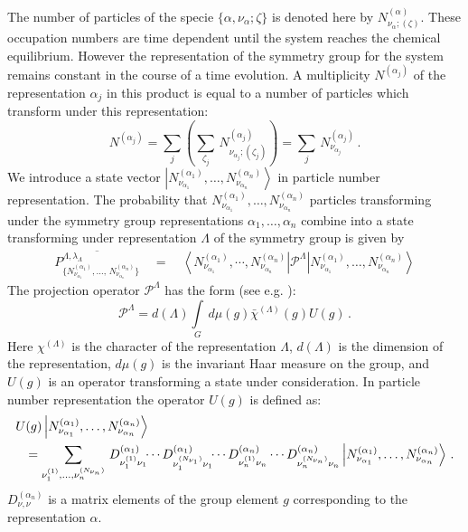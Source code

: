 \documentclass[a4paper,aps]{revtex4}
\begin{document}
The number of particles of the specie
$\{\alpha,\nu_\alpha;\zeta\}$ is denoted here by
$N^{(\alpha)}_{\nu_\alpha;(\zeta)}.$ These occupation numbers are
time dependent until the system reaches the chemical equilibrium.
However the representation of the symmetry group for the system
remains constant in the course of a time evolution. A multiplicity
$N^{(\alpha_j)}$ of the representation $\alpha_j$ in this product
is equal to a number of particles which transform under this
representation:
\begin{equation}
N^{(\alpha_j)} = \sum_j\left(\sum_{\zeta_j}\,
N^{(\alpha_j)}_{\nu_{\alpha_j};(\zeta_j)}\right)= \sum_j\,
N^{(\alpha_j)}_{\nu_{\alpha_j}}\,.
\end{equation}
We introduce a state vector $\left\vert
N^{(\alpha_1)}_{\nu_{\alpha_1}},\dots,
N^{(\alpha_n)}_{\nu_{\alpha_n}}\right\rangle $ in particle number
representation. The probability that
$N^{(\alpha_1)}_{\nu_{\alpha_1}},\dots, N^{(\alpha_n)}_{
\nu_{\alpha_n}}$ particles transforming under the symmetry group
representations $\alpha_1,\dots,\alpha_n$ combine into a state
transforming under representation $\Lambda$ of the symmetry group
is given by
\begin{eqnarray}\label{proj1states}
\overline{P^{\Lambda,\lambda_{\Lambda}}_{\{N^{(\alpha_1)}_{\nu_{\alpha_1}},
\dots,\,N^{(\alpha_n)}_{\nu_{\alpha_n}}\}}}\quad =
\quad\left\langle N^{(\alpha_1)}_{\nu_{\alpha_1}},
\cdots,N^{(\alpha_n)}_{\nu_{\alpha_n}}\right\vert
{\mathcal P}^{\Lambda}\left\vert N^{(\alpha_1)}_{\nu_{\alpha_1}},
\dots, N^{(\alpha_n)}_{\nu_{\alpha_n}}\right\rangle
\end{eqnarray}
The projection operator ${\mathcal P}^{\Lambda}$ has the form
(see e.g. \cite{Wigner}):
\begin{equation}\label{proj1}
{\mathcal
P}^{\Lambda}=d(\Lambda)\int\limits_G\,d\mu(g)\bar\chi^{(\Lambda)}(g)U(g)\,.
\end{equation}
Here $\chi^{(\Lambda)}$ is the character of the representation
$\Lambda$, $d(\Lambda)$ is the dimension of the representation,
$d\mu(g)$ is the invariant Haar measure on the group, and $U(g)$
is an operator transforming a state under consideration. In
particle number representation the operator $U(g)$ is defined as:
\begin{eqnarray}\label{transf}
\lefteqn{U(g)\left\vert N^{(\alpha_1)}_{\nu_{\alpha_1}},\dots,
N^{(\alpha_n)}_{\nu_{\alpha_n}}\right\rangle}\\ & &
=\sum\limits_{\nu_1^{(1)},\dots,\nu_n^{(N_{\nu_n})}}\,
D^{(\alpha_1)}_{\nu_1^{(1)}\nu_1}\!\!\cdots
D^{(\alpha_1)}_{\nu_1^{(N_{\nu_1})}\nu_1}\!\!\cdots
D^{(\alpha_n)}_{\nu_n^{(1)}\nu_n}\cdots
D^{(\alpha_n)}_{\nu_n^{(N_{\nu_n})}\nu_n} \left\vert
N^{(\alpha_1)}_{\nu_{\alpha_1}},\dots,
N^{(\alpha_n)}_{\nu_{\alpha_n}}\right\rangle\,.\nonumber
\end{eqnarray}
$D^{(\alpha_n)}_{\nu,\nu}$ is a matrix elements of the group
element $g$ corresponding to the representation $\alpha$.
\end{document}
